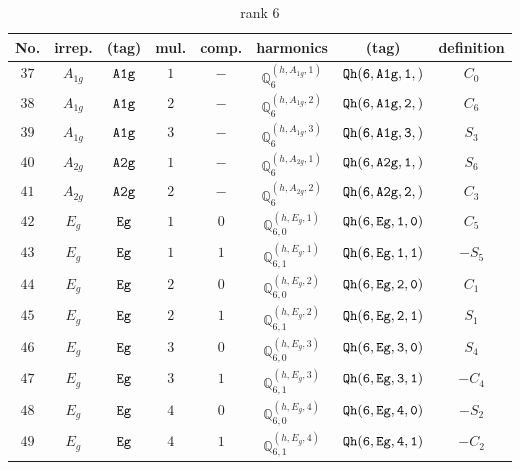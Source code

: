 \documentclass[fleqn,8pt]{jsarticle}
\begin{document}
\begin{table}[ht!]
\begin{center}
\caption{rank 6}
\renewcommand{\arraystretch}{1.3}
\begin{tabular}{cccccccc} \hline \hline
No. & irrep. & (tag) & mul. & comp. & harmonics & (tag) & definition \\ \hline
$ 37 $ & $ A_{1g} $ & $ {\tt A1g} $ & $ 1 $ & $ - $ & $ \mathbb{Q}_{6}^{(h,A_{1g},1)} $ & $ {\tt Qh(6,A1g,1,)} $ & $ C_{0} $ \\
$ 38 $ & $ A_{1g} $ & $ {\tt A1g} $ & $ 2 $ & $ - $ & $ \mathbb{Q}_{6}^{(h,A_{1g},2)} $ & $ {\tt Qh(6,A1g,2,)} $ & $ C_{6} $ \\
$ 39 $ & $ A_{1g} $ & $ {\tt A1g} $ & $ 3 $ & $ - $ & $ \mathbb{Q}_{6}^{(h,A_{1g},3)} $ & $ {\tt Qh(6,A1g,3,)} $ & $ S_{3} $ \\
$ 40 $ & $ A_{2g} $ & $ {\tt A2g} $ & $ 1 $ & $ - $ & $ \mathbb{Q}_{6}^{(h,A_{2g},1)} $ & $ {\tt Qh(6,A2g,1,)} $ & $ S_{6} $ \\
$ 41 $ & $ A_{2g} $ & $ {\tt A2g} $ & $ 2 $ & $ - $ & $ \mathbb{Q}_{6}^{(h,A_{2g},2)} $ & $ {\tt Qh(6,A2g,2,)} $ & $ C_{3} $ \\
$ 42 $ & $ E_{g} $ & $ {\tt Eg} $ & $ 1 $ & $ 0 $ & $ \mathbb{Q}_{6,0}^{(h,E_{g},1)} $ & $ {\tt Qh(6,Eg,1,0)} $ & $ C_{5} $ \\
$ 43 $ & $ E_{g} $ & $ {\tt Eg} $ & $ 1 $ & $ 1 $ & $ \mathbb{Q}_{6,1}^{(h,E_{g},1)} $ & $ {\tt Qh(6,Eg,1,1)} $ & $ - S_{5} $ \\
$ 44 $ & $ E_{g} $ & $ {\tt Eg} $ & $ 2 $ & $ 0 $ & $ \mathbb{Q}_{6,0}^{(h,E_{g},2)} $ & $ {\tt Qh(6,Eg,2,0)} $ & $ C_{1} $ \\
$ 45 $ & $ E_{g} $ & $ {\tt Eg} $ & $ 2 $ & $ 1 $ & $ \mathbb{Q}_{6,1}^{(h,E_{g},2)} $ & $ {\tt Qh(6,Eg,2,1)} $ & $ S_{1} $ \\
$ 46 $ & $ E_{g} $ & $ {\tt Eg} $ & $ 3 $ & $ 0 $ & $ \mathbb{Q}_{6,0}^{(h,E_{g},3)} $ & $ {\tt Qh(6,Eg,3,0)} $ & $ S_{4} $ \\
$ 47 $ & $ E_{g} $ & $ {\tt Eg} $ & $ 3 $ & $ 1 $ & $ \mathbb{Q}_{6,1}^{(h,E_{g},3)} $ & $ {\tt Qh(6,Eg,3,1)} $ & $ - C_{4} $ \\
$ 48 $ & $ E_{g} $ & $ {\tt Eg} $ & $ 4 $ & $ 0 $ & $ \mathbb{Q}_{6,0}^{(h,E_{g},4)} $ & $ {\tt Qh(6,Eg,4,0)} $ & $ - S_{2} $ \\
$ 49 $ & $ E_{g} $ & $ {\tt Eg} $ & $ 4 $ & $ 1 $ & $ \mathbb{Q}_{6,1}^{(h,E_{g},4)} $ & $ {\tt Qh(6,Eg,4,1)} $ & $ - C_{2} $ \\
 \hline \hline
\end{tabular}
\end{center}
\end{table}
\end{document}
